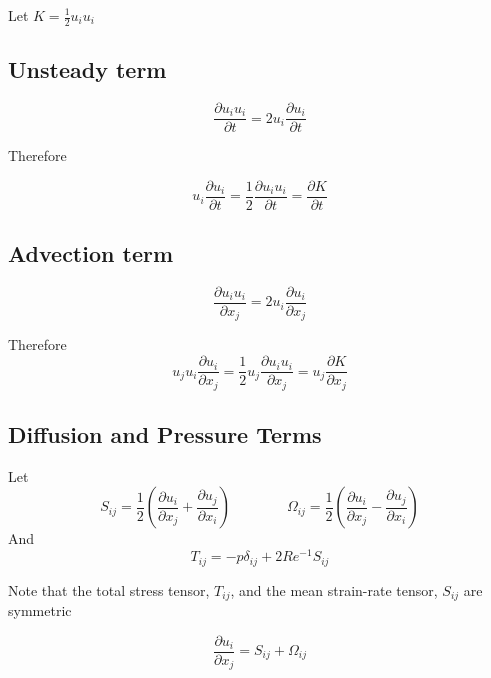\documentclass[11pt]{article}
\begin{document}
Let $K = \frac{1}{2} u_i u_i$

\subsection{Unsteady term}
\begin{equation}
	\frac{\partial u_i u_i}{\partial t}
	=
	2 u_i \frac{\partial u_i}{\partial t}
\end{equation}

Therefore

\begin{equation}
	u_i \frac{\partial u_i}{\partial t}
	=
	\frac{1}{2} \frac{\partial u_i u_i}{\partial t}
	=
	\frac{\partial K}{\partial t}
\end{equation}

\subsection{Advection term}
\begin{equation}
	\frac{\partial u_i u_i}{\partial x_j}
	=
	2 u_i \frac{\partial u_i}{\partial x_j}
\end{equation}

Therefore
\begin{equation}
	u_j u_i \frac{\partial u_i}{\partial x_j}
	=
	\frac{1}{2} u_j \frac{\partial u_i u_i}{\partial x_j}
	=
	u_j \frac{\partial K}{\partial x_j}
\end{equation}


\subsection{Diffusion and Pressure Terms}
Let
\begin{equation}
	S_{ij} 
	=
	\frac{1}{2}
	\left(
	\frac{\partial u_i}{\partial x_j}
	+
	\frac{\partial u_j}{\partial x_i}
	\right)
	\qquad \qquad
	\Omega_{ij} 
	=
	\frac{1}{2}
	\left(
	\frac{\partial u_i}{\partial x_j}
	-
	\frac{\partial u_j}{\partial x_i}
	\right)
\end{equation}
And
\begin{equation}
	T_{ij}
	=
	-p \delta_{ij}
	+
	2 Re^{-1}
	S_{ij}
\end{equation}

Note that the total stress tensor, $T_{ij}$, and the mean strain-rate tensor, $S_{ij}$ are symmetric

\begin{equation}
	\frac{\partial u_i}{\partial x_j}
	= S_{ij} + \Omega_{ij}
\end{equation}
\end{document}
